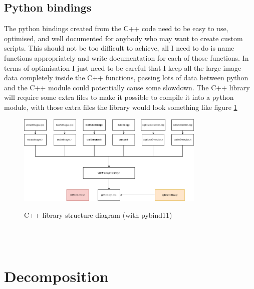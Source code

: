 \documentclass[11pt]{report}
\begin{document}
\subsection{Python bindings}
The python bindings created from the C++ code need to be easy to use, optimised, and well documented for anybody who may want to create custom scripts. This should not be too difficult to achieve, all I need to do is name functions appropriately and write documentation for each of those functions. In terms of optimisation I just need to be careful that I keep all the large image data completely inside the C++ functions, passing lots of data between python and the C++ module could potentially cause some slowdown.
The C++ library will require some extra files to make it possible to compile it into a python module, with those extra files the library would look something like figure \ref{fig:libraryStructurePyBind11}
\begin{figure}[h!]
	\centering
	\caption{C++ library structure diagram (with pybind11)}
	\includegraphics[width=0.8\textwidth]{designDiagrams/libraryStructurePyBind11}
	\label{fig:libraryStructurePyBind11}
\end{figure}\\\\

\section{Decomposition}
\end{document}
